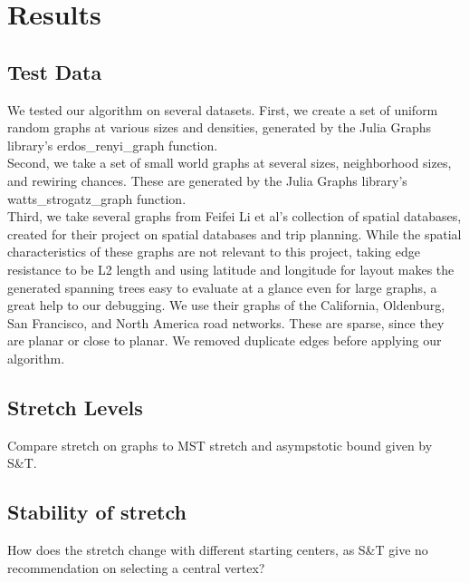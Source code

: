 \documentclass{article}
\begin{document}
\section*{Results}
\subsection*{Test Data}
We tested our algorithm on several datasets.  First, we create a set of uniform random graphs at various sizes and densities, generated by the Julia Graphs library's erdos\_renyi\_graph function.\\
Second, we take a set of small world graphs at several sizes, neighborhood sizes, and rewiring chances.  These are generated by the Julia Graphs library's watts\_strogatz\_graph function.\\
Third, we take several graphs from Feifei Li et al's collection of spatial databases\cite{feifei-data}, created for their project on spatial databases and trip planning\cite{feifei-paper}.  While the spatial characteristics of these graphs are not relevant to this project, taking edge resistance to be L2 length and using latitude and longitude for layout makes the generated spanning trees easy to evaluate at a glance even for large graphs, a great help to our debugging.  We use their graphs of the California, Oldenburg, San Francisco, and North America road networks.  These are sparse, since they are planar or close to planar.  We removed duplicate edges before applying our algorithm.  
\subsection{Stretch Levels}
Compare stretch on graphs to MST stretch and asympstotic bound given by S\&T.
\subsection{Stability of stretch}
How does the stretch change with different starting centers, as S\&T give no recommendation on selecting a central vertex?
{}

\end{document}
